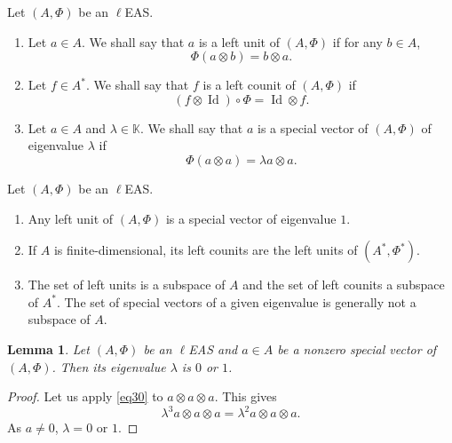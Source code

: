 \documentclass[10pt,a4paper]{amsart}
\numberwithin{equation}{section}
\newtheorem{Lemma}[Theorem]{Lemma}
\begin{document}
\begin{Definition}\label{defi4.3}
Let $(A,\Phi)$ be an $\ell$EAS.
\begin{enumerate}\itemsep=0pt
\item[(1)] Let $a\in A$. We shall say that $a$ is a left unit of $(A,\Phi)$ if for any $b\in A$,
\[
\Phi(a\otimes b)=b\otimes a.
\]
\item[(2)] Let $f \in A^*$. We shall say that $f$ is a left counit of $(A,\Phi)$ if
\[
(f \otimes \operatorname{Id})\circ \Phi=\operatorname{Id} \otimes f.
\]
\item[(3)] Let $a\in A$ and $\lambda \in \mathbb{K}$. We shall say that $a$ is a special vector of $(A,\Phi)$ of eigenvalue $\lambda$ if
 \[
 \Phi(a\otimes a)=\lambda a\otimes a.
 \]
\end{enumerate}
\end{Definition}

\begin{Remark}
Let $(A,\Phi)$ be an $\ell$EAS.
\begin{enumerate}\itemsep=0pt
\item[(1)] Any left unit of $(A,\Phi)$ is a special vector of eigenvalue $1$.
\item[(2)] If $A$ is finite-dimensional, its left counits are the left units of $(A^*,\Phi^*)$.
\item[(3)] The set of left units is a subspace of $A$ and the set of left counits a subspace of $A^*$. The set of special vectors of a given eigenvalue is generally not a subspace of $A$.
\end{enumerate}
\end{Remark}

\begin{Lemma}
Let $(A,\Phi)$ be an $\ell$EAS and $a\in A$ be a nonzero special vector of $(A,\Phi)$. Then its eigenvalue $\lambda$ is $0$ or $1$.
\end{Lemma}

\begin{proof}
Let us apply \eqref{eq30} to $a\otimes a\otimes a$. This gives
\[
\lambda^3 a\otimes a\otimes a=\lambda^2 a\otimes a\otimes a.
\] As $a\neq 0$, $\lambda=0$ or $1$.\end{proof}
\end{document}
